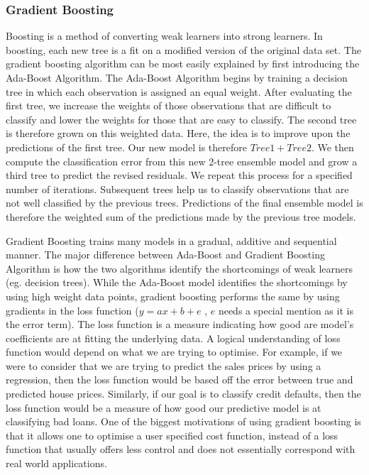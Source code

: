 \documentclass[12pt]{article}
\begin{document}
\subsubsection{Gradient Boosting}

Boosting is a method of converting weak learners into strong learners. In boosting, each new tree is a fit on a modified version of the original data set. The gradient boosting algorithm can be most easily explained by first introducing the Ada-Boost Algorithm. The Ada-Boost Algorithm begins by training a decision tree in which each observation is assigned an equal weight. After evaluating the first tree, we increase the weights of those observations that are difficult to classify and lower the weights for those that are easy to classify. The second tree is therefore grown on this weighted data. Here, the idea is to improve upon the predictions of the first tree. Our new model is therefore $Tree 1 + Tree 2$. We then compute the classification error from this new 2-tree ensemble model and grow a third tree to predict the revised residuals. We repeat this process for a specified number of iterations. Subsequent trees help us to classify observations that are not well classified by the previous trees. Predictions of the final ensemble model is therefore the weighted sum of the predictions made by the previous tree models.

Gradient Boosting trains many models in a gradual, additive and sequential manner. The major difference between Ada-Boost and Gradient Boosting Algorithm is how the two algorithms identify the shortcomings of weak learners (eg. decision trees). While the Ada-Boost model identifies the shortcomings by using high weight data points, gradient boosting performs the same by using gradients in the loss function ($y=ax+b+e$ , $e$ needs a special mention as it is the error term). The loss function is a measure indicating how good are model’s coefficients are at fitting the underlying data. A logical understanding of loss function would depend on what we are trying to optimise. For example, if we were to consider that we are trying to predict the sales prices by using a regression, then the loss function would be based off the error between true and predicted house prices. Similarly, if our goal is to classify credit defaults, then the loss function would be a measure of how good our predictive model is at classifying bad loans. One of the biggest motivations of using gradient boosting is that it allows one to optimise a user specified cost function, instead of a loss function that usually offers less control and does not essentially correspond with real world applications.
\end{document}
